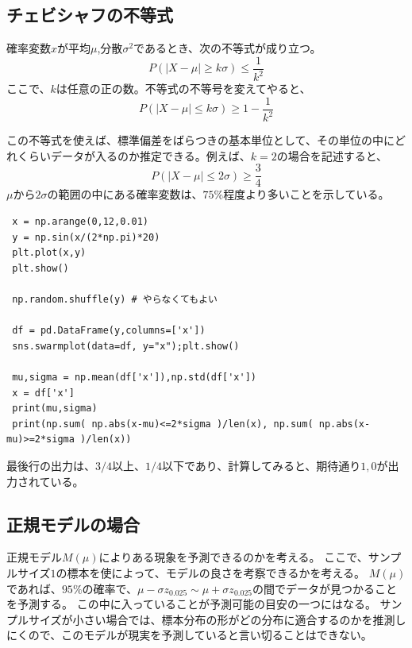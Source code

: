 \subsection{チェビシャフの不等式}
\begin{lemm}
 確率変数$x$が平均$\mu$,分散$\sigma^2$であるとき、次の不等式が成り立つ。
 \begin{equation*}
  P(|X-\mu| \geq k\sigma) \leq \frac{1}{k^2}
 \end{equation*}
ここで、$k$は任意の正の数。不等式の不等号を変えてやると、
 \begin{equation*}
  P(|X-\mu| \leq k\sigma) \geq 1-\frac{1}{k^2}
 \end{equation*}
\end{lemm}
この不等式を使えば、標準偏差をばらつきの基本単位として、その単位の中にどれくらいデータが入るのか推定できる。例えば、$k=2$の場合を記述すると、
 \begin{equation*}
  P(|X-\mu| \leq 2\sigma) \geq \frac{3}{4}
 \end{equation*}
$\mu$から$2\sigma$の範囲の中にある確率変数は、$75\%$程度より多いことを示している。
\begin{lstlisting}
 x = np.arange(0,12,0.01)
 y = np.sin(x/(2*np.pi)*20)
 plt.plot(x,y)
 plt.show()

 np.random.shuffle(y) # やらなくてもよい

 df = pd.DataFrame(y,columns=['x'])
 sns.swarmplot(data=df, y="x");plt.show()

 mu,sigma = np.mean(df['x']),np.std(df['x'])
 x = df['x']
 print(mu,sigma)
 print(np.sum( np.abs(x-mu)<=2*sigma )/len(x), np.sum( np.abs(x-mu)>=2*sigma )/len(x))
\end{lstlisting}
最後行の出力は、$3/4$以上、$1/4$以下であり、計算してみると、期待通り$1,0$が出力されている。




\subsection{正規モデルの場合}
正規モデル$M(\mu)$によりある現象を予測できるのかを考える。
ここで、サンプルサイズ$1$の標本を使によって、モデルの良さを考察できるかを考える。
$M(\mu)$であれば、$95\%$の確率で、$\mu-\sigma z_{0.025}\sim \mu+\sigma z_{0.025}$の間でデータが見つかることを予測する。
この中に入っていることが予測可能の目安の一つにはなる。
サンプルサイズが小さい場合では、標本分布の形がどの分布に適合するのかを推測しにくので、このモデルが現実を予測していると言い切ることはできない。

